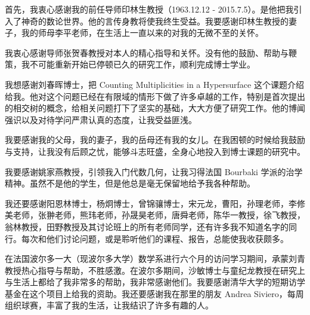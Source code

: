 \begin{acknowledgement}
  首先，我衷心感谢我的前任导师印林生教授（1963.12.12 - 2015.7.5）。是他把我引入了神奇的数论世界。他的言传身教将使我终生受益。我要感谢印林生教授的妻子，我的师母李平老师，在生活上一直以来的对我的无微不至的关怀。

  我衷心感谢导师张贺春教授对本人的精心指导和关怀。没有他的鼓励、帮助与鞭策，我不可能重新开始已停顿已久的研究工作，顺利完成博士学业。

  我想感谢刘春晖博士，把 Counting Multiplicities in a Hypersurface 这个课题介绍给我。他对这个问题已经在有限域的情形下做了许多卓越的工作，特别是首次提出的相交树的概念，给相关问题打下了坚实的基础，大大方便了研究工作。他的博闻强识以及对待学问严肃认真的态度，让我受益匪浅。

  我要感谢我的父母，我的妻子，我的岳母还有我的女儿。在我困顿的时候给我鼓励与支持，让我没有后顾之忧，能够斗志旺盛，全身心地投入到博士课题的研究中。

  我要感谢姚家燕教授，引领我入门代数几何，让我习得法国 Bourbaki 学派的治学精神。虽然不是他的学生，但是他总是毫无保留地给予我各种帮助。

  我还要感谢阳恩林博士，杨炯博士，曾锦骧博士，宋元龙，曹阳，孙理老师，李修美老师，张翀老师，熊玮老师，孙晟昊老师，唐舜老师，陈华一教授，徐飞教授，翁林教授，田野教授及其讨论班上的所有老师同学，还有许多我不知道名字的同行。每次和他们讨论问题，或是聆听他们的课程、报告，总能使我收获颇多。

  在法国波尔多一大（现波尔多大学）数学系进行六个月的访问学习期间，承蒙刘青教授热心指导与帮助，不胜感激。在波尔多期间，沙敏博士与童纪龙教授在研究上与生活上都给了我非常多的帮助，我非常感谢他们。我要感谢清华大学的短期访学基金在这个项目上给我的资助。我还要感谢我在那里的朋友 Andrea Siviero，每周组织球赛，丰富了我的生活，让我结识了许多有趣的人。

\end{acknowledgement}

